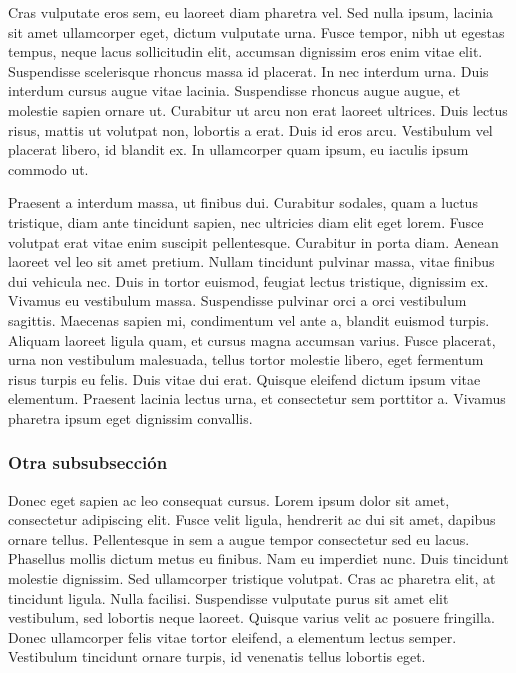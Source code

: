 \documentclass[a4paper,10pt]{article}
\theoremstyle{teorema}
\theoremstyle{plano}
\theoremstyle{titulo}
\begin{document}
Cras vulputate eros sem, eu laoreet diam pharetra vel. Sed nulla ipsum, lacinia sit amet ullamcorper eget, dictum vulputate urna. Fusce tempor, nibh ut egestas tempus, neque lacus sollicitudin elit, accumsan dignissim eros enim vitae elit. Suspendisse scelerisque rhoncus massa id placerat. In nec interdum urna. Duis interdum cursus augue vitae lacinia. Suspendisse rhoncus augue augue, et molestie sapien ornare ut. Curabitur ut arcu non erat laoreet ultrices. Duis lectus risus, mattis ut volutpat non, lobortis a erat. Duis id eros arcu. Vestibulum vel placerat libero, id blandit ex. In ullamcorper quam ipsum, eu iaculis ipsum commodo ut.

Praesent a interdum massa, ut finibus dui. Curabitur sodales, quam a luctus tristique, diam ante tincidunt sapien, nec ultricies diam elit eget lorem. Fusce volutpat erat vitae enim suscipit pellentesque. Curabitur in porta diam. Aenean laoreet vel leo sit amet pretium. Nullam tincidunt pulvinar massa, vitae finibus dui vehicula nec. Duis in tortor euismod, feugiat lectus tristique, dignissim ex. Vivamus eu vestibulum massa. Suspendisse pulvinar orci a orci vestibulum sagittis. Maecenas sapien mi, condimentum vel ante a, blandit euismod turpis. Aliquam laoreet ligula quam, et cursus magna accumsan varius. Fusce placerat, urna non vestibulum malesuada, tellus tortor molestie libero, eget fermentum risus turpis eu felis. Duis vitae dui erat. Quisque eleifend dictum ipsum vitae elementum. Praesent lacinia lectus urna, et consectetur sem porttitor a. Vivamus pharetra ipsum eget dignissim convallis.

\subsubsection{Otra subsubsección}\label{subsubsec:1.1.2}

Donec eget sapien ac leo consequat cursus. Lorem ipsum dolor sit amet, consectetur adipiscing elit. Fusce velit ligula, hendrerit ac dui sit amet, dapibus ornare tellus. Pellentesque in sem a augue tempor consectetur sed eu lacus. Phasellus mollis dictum metus eu finibus. Nam eu imperdiet nunc. Duis tincidunt molestie dignissim. Sed ullamcorper tristique volutpat. Cras ac pharetra elit, at tincidunt ligula. Nulla facilisi. Suspendisse vulputate purus sit amet elit vestibulum, sed lobortis neque laoreet. Quisque varius velit ac posuere fringilla. Donec ullamcorper felis vitae tortor eleifend, a elementum lectus semper. Vestibulum tincidunt ornare turpis, id venenatis tellus lobortis eget.
\end{document}
